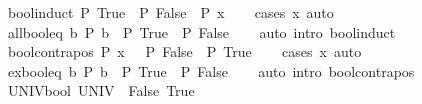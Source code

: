 \begin{isabellebody}
\begin{isamarkuptext}
\end{isamarkuptext}\isamarkuptrue%
\isamarkupfalse%
\ bool{\isacharunderscore}{\kern0pt}induct{\isacharcolon}{\kern0pt}\ {\isachardoublequoteopen}P\ True\ {\isasymLongrightarrow}\ P\ False\ {\isasymLongrightarrow}\ P\ x{\isachardoublequoteclose}\isanewline
%
\isadelimproof
\ \ %
\endisadelimproof
%
\isatagproof
{}\isamarkupfalse%
\ {\isacharparenleft}{\kern0pt}cases\ x{\isacharparenright}{\kern0pt}\ auto%
\endisatagproof
{\isafoldproof}%
%
\isadelimproof
\isanewline
%
\endisadelimproof
\isanewline
{}\isamarkupfalse%
\ all{\isacharunderscore}{\kern0pt}bool{\isacharunderscore}{\kern0pt}eq{\isacharcolon}{\kern0pt}\ {\isachardoublequoteopen}{\isacharparenleft}{\kern0pt}{\isasymforall}b{\isachardot}{\kern0pt}\ P\ b{\isacharparenright}{\kern0pt}\ {\isasymlongleftrightarrow}\ P\ True\ {\isasymand}\ P\ False{\isachardoublequoteclose}\isanewline
%
\isadelimproof
\ \ %
\endisadelimproof
%
\isatagproof
{}\isamarkupfalse%
\ {\isacharparenleft}{\kern0pt}auto\ intro{\isacharcolon}{\kern0pt}\ bool{\isacharunderscore}{\kern0pt}induct{\isacharparenright}{\kern0pt}%
\endisatagproof
{\isafoldproof}%
%
\isadelimproof
\isanewline
%
\endisadelimproof
\isanewline
{}\isamarkupfalse%
\ bool{\isacharunderscore}{\kern0pt}contrapos{\isacharcolon}{\kern0pt}\ {\isachardoublequoteopen}P\ x\ {\isasymLongrightarrow}\ {\isasymnot}\ P\ False\ {\isasymLongrightarrow}\ P\ True{\isachardoublequoteclose}\isanewline
%
\isadelimproof
\ \ %
\endisadelimproof
%
\isatagproof
{}\isamarkupfalse%
\ {\isacharparenleft}{\kern0pt}cases\ x{\isacharparenright}{\kern0pt}\ auto%
\endisatagproof
{\isafoldproof}%
%
\isadelimproof
\isanewline
%
\endisadelimproof
\isanewline
{}\isamarkupfalse%
\ ex{\isacharunderscore}{\kern0pt}bool{\isacharunderscore}{\kern0pt}eq{\isacharcolon}{\kern0pt}\ {\isachardoublequoteopen}{\isacharparenleft}{\kern0pt}{\isasymexists}b{\isachardot}{\kern0pt}\ P\ b{\isacharparenright}{\kern0pt}\ {\isasymlongleftrightarrow}\ P\ True\ {\isasymor}\ P\ False{\isachardoublequoteclose}\isanewline
%
\isadelimproof
\ \ %
\endisadelimproof
%
\isatagproof
{}\isamarkupfalse%
\ {\isacharparenleft}{\kern0pt}auto\ intro{\isacharcolon}{\kern0pt}\ bool{\isacharunderscore}{\kern0pt}contrapos{\isacharparenright}{\kern0pt}%
\endisatagproof
{\isafoldproof}%
%
\isadelimproof
\isanewline
%
\endisadelimproof
\isanewline
{}\isamarkupfalse%
\ UNIV{\isacharunderscore}{\kern0pt}bool{\isacharcolon}{\kern0pt}\ {\isachardoublequoteopen}UNIV\ {\isacharequal}{\kern0pt}\ {\isacharbraceleft}{\kern0pt}False{\isacharcomma}{\kern0pt}\ True{\isacharbraceright}{\kern0pt}{\isachardoublequoteclose}\isanewline

\end{isabellebody}
